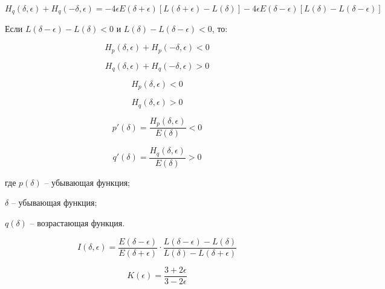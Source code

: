 \begin{equation}
	\label{eq:equation88}
	H_{q}(\delta, \epsilon) + H_{q}(- \delta, \epsilon) = - 4 \epsilon E (\delta + \epsilon) [L(\delta + \epsilon) - L(\delta)] - 4 \epsilon E (\delta - \epsilon)[L(\delta) - L (\delta - \epsilon)]  
\end{equation}

Если $L (\delta - \epsilon) - L(\delta) < 0$ и $L(\delta) - L(\delta - \epsilon) < 0$, то:

\begin{equation}
	\label{eq:equation89}
	H_{p}(\delta, \epsilon) + H_{p}(- \delta, \epsilon) < 0  
\end{equation}

\begin{equation}
	\label{eq:equation90}
	H_{q}(\delta, \epsilon) + H_{q}(- \delta, \epsilon) > 0  
\end{equation}

\begin{equation}
	\label{eq:equation91}
	H_{p}(\delta, \epsilon) < 0
\end{equation}

\begin{equation}
	\label{eq:equation92}
	H_{q}(\delta, \epsilon) > 0
\end{equation}

\begin{equation}
	\label{eq:equation93}
	p'(\delta) = \frac{H_{p}(\delta, \epsilon)}{E(\delta)} < 0
\end{equation}

\begin{equation}
	\label{eq:equation94}
	q'(\delta) = \frac{H_{q}(\delta, \epsilon)}{E(\delta)} > 0
\end{equation}

где $p(\delta)$ -- убывающая функция;

$\delta$ -- убывающая функция;

$q(\delta)$ -- возрастающая функция.

\begin{equation}
	\label{eq:equation95}
	I(\delta, \epsilon) = \frac{E(\delta - \epsilon)}{E(\delta + \epsilon)} \cdot \frac{L(\delta - \epsilon) - L(\delta)}{L(\delta) - L(\delta + \epsilon)}
\end{equation}

\begin{equation}
	\label{eq:equation96}
	K(\epsilon) = \frac{3 + 2\epsilon}{3 - 2\epsilon}
\end{equation}

